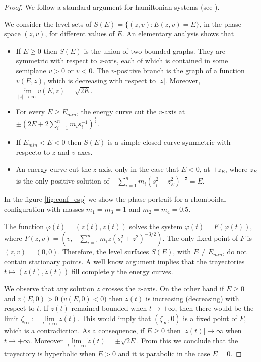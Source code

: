 \documentclass[twoside]{article}
\theoremstyle{remark}
\begin{document}
\begin{proof}
We follow a standard argument for hamiltonian systems (see \cite{A}).

We consider the level sets of $S(E)=\{(z,v):E(z,v)=E\}$, in the phase space $(z,v)$,  for different values of $E$. An elementary analysis shows that
\begin{itemize}
 \item If $E\geq 0$ then $S(E)$ is the union of two bounded graphs. They are symmetric with respect to $z$-axis, each of which is contained  in some semiplane $v> 0$ or $v<0$. The $v$-positive branch is the graph of a function $v(E,z)$, which  is decreasing with respect to $|z|$. Moreover, $\lim\limits_{|z|\to \infty}v(E,z)=\sqrt{2E}$.

 \item For every $E\geq E_{min}$, the energy curve cut the $v$-axis at $\pm(2E+2\sum_{i=1}^n m_is_i^{-1})^{\frac12}$.

 \item If $E_{min}<E<0$ then $S(E)$ is a simple closed curve symmetric with respecto to $z$ and $v$ axes.

 \item  An energy curve cut the $z$-axis, only in the case that $E<0$, at $\pm z_{E}$, where $z_E$ is the only positive solution of $-\sum_{i=1}^n m_i (s_i^2+z_{E}^2)^{-\frac12}=E$.
\end{itemize}

In the figure  \ref{fig:conf_esp} we show the phase portrait for a rhomboidal configuration with masses $m_1=m_3=1$ and $m_2=m_4=0.5$.

The function $\varphi(t)=(z(t),\dot{z}(t))$ solves the system $\dot{\varphi}(t)=F(\varphi(t))$, where $F(z,v)=(v,-\sum_{i=1}^{n}m_iz (s_i^2+z^2)^{-3/2})$. The only fixed point of $F$ is $(z,v)=(0,0)$. Therefore, the level surfaces $S(E)$, with $E\neq E_{min}$, do not contain stationary points. A well know argument implies that the trayectories $t\mapsto (z(t),\dot{z}(t))$  fill completely the energy curves.

We observe that any solution $z$ crosses the $v$-axis. On the other hand if $E\geq 0$ and $v(E,0)>0$ ($v(E,0)<0$) then $z(t)$ is increasing (decreasing) with respect to $t$. If $z(t)$ remained bounded when $t\to +\infty$, then there would be the limit $\zeta_{\infty}:=\lim\limits_{t\to\infty}z(t)$. This would imply  that $(\zeta_{\infty},0)$ is a fixed point of $F$, which is a contradiction.  As a consequence, if $E\geq 0$ then $|z(t)|\to \infty$ when $t\to  +\infty$. Moreover $\lim\limits_{t\to +\infty}\dot{z}(t)=\pm\sqrt{2E}$.  From this we conclude that the trayectory is hyperbolic when $E>0$ and it is parabolic in the case $E=0$.


\end{proof}
\end{document}
